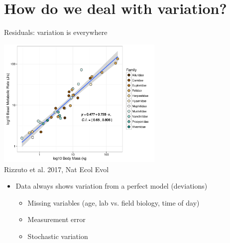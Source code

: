 \documentclass[xcolor=x11names,compress]{beamer}
\renewcommand{\(}{\begin{columns}}
\renewcommand{\)}{\end{columns}}
\newcommand{\<}[1]{\begin{column}{#1}}
\renewcommand{\>}{\end{column}}
\begin{document}
\section{How do we deal with variation?}


\begin{frame}{Residuals: variation is everywhere}

  \begin{center}
            \includegraphics[width=0.6\textwidth]{CarnivoreBMRplot.pdf}\\
            \vspace{-6pt}
            {\tiny Rizzuto et al. 2017, Nat Ecol Evol}
            
    \begin{itemize}
    \item Data always shows variation from a perfect model (deviations)
    \begin{itemize}
    \item Missing variables (age, lab vs. field biology, time of day) 
    \item Measurement error 
    \item Stochastic variation
    \end{itemize}
    \end{itemize}
\end{center}		

\end{frame}
    
\end{document}
